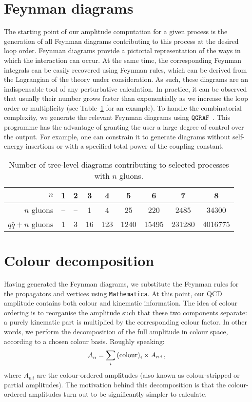 \documentclass[main.tex]{subfiles}
\begin{document}
\section{Feynman diagrams}
The starting point of our amplitude computation for a given process is the generation of all Feynman diagrams contributing to this process at the desired loop order. Feynman diagrams provide a pictorial representation of the ways in which the interaction can occur. At the same time, the corresponding Feynman integrals can be easily recovered using Feynman rules, which can be derived from the Lagrangian of the theory under consideration. As such, these diagrams are an indispensable tool of any perturbative calculation. In practice, it can be observed that usually their number grows faster than exponentially as we increase the loop order or multiplicity (see Table~\ref{tab:ndiags} for an example). To handle the combinatorial complexity, we generate the relevant Feynman diagrams using $\texttt{QGRAF}$~\cite{Nogueira:1991ex}. This programme has the advantage of granting the user a large degree of control over the output. For example, one can constrain it to generate diagrams without self-energy insertions or with a specified total power of the coupling constant.
\begin{table}[b]
	\begin{center}
		\begin{tabular}{r|c|c|c|c|c|c|c|c}
			  $n$ & 1 & 2 & 3 & 4 & 5 & 6 & 7 & 8 \\
			\hline
			$n$ gluons   & -- & -- & 1 & 4 & 25 & 220 & 2485 & 34300 \\
			$q\bar{q} + n$ gluons & 1 & 3 & 16 & 123 & 1240 & 15495 & 231280 & 4016775 \\
		\end{tabular}
	\end{center}
 \caption{Number of tree-level diagrams contributing to selected processes with $n$ gluons.}
 \label{tab:ndiags}
\end{table}
\section{Colour decomposition} \label{sec:colourdec}
Having generated the Feynman diagrams, we substitute the Feynman rules for the propagators and vertices using \texttt{Mathematica}. At this point, our QCD amplitude contains both colour and kinematic information. The idea of colour ordering is to reorganise the amplitude such that these two components separate: a purely kinematic part is multiplied by the corresponding colour factor. In other words, we perform the decomposition of the full amplitude in colour space, according to a chosen colour basis. Roughly speaking:
\begin{equation}
    \mathcal{A}_{n}^{} = \sum_i \text{(colour)}_i \times A_{n\,i} \,, 
\end{equation}
where $A_{n\,i}$ are the colour-ordered amplitudes (also known as colour-stripped or partial amplitudes). The motivation behind this decomposition is that the colour-ordered amplitudes turn out to be significantly simpler to calculate.
\end{document}

